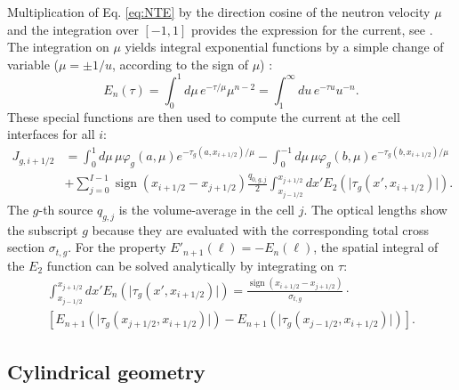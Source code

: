 \documentclass{ictt26}
\DeclareMathOperator{\sign}{sign}
\begin{document}
Multiplication of Eq. \ref{eq:NTE} by the direction cosine of the neutron velocity $\mu$ and the integration over $[-1, 1]$ provides the expression for the current, see \cite{tomatis2011application}. The integration on $\mu$ yields integral exponential functions by a simple change of variable ($\mu = \pm 1/u$, according to the sign of $\mu$) \cite{AS1964handbook}:
\begin{equation*}
E_n(\tau) = \int_0^1{d\mu\, e^{-\tau / \mu} \mu^{n-2}} = \int_1^\infty{du\, e^{-\tau u}u^{-n}}.
\end{equation*}
These special functions are then used to compute the current at the cell interfaces for all $i$:
\begin{equation}
\begin{split}
J_{g,i+1/2} &= \int_0^1 {d\mu\, \mu \varphi_g(a, \mu) e^{-\tau_g(a, x_{i+1/2})/\mu}}
       - \int_0^{-1}{d\mu\, \mu \varphi_g(b, \mu) e^{-\tau_g(b, x_{i+1/2})/\mu}}\\
       & + \sum_{j=0}^{I-1} { \sign(x_{i+1/2} - x_{j+1/2}) \frac{q_{0,g,j}}{2} \int_{x_{j-1/2}}^{x_{j+1/2}}{dx' E_{2}\left(\lvert \tau_g(x', x_{i+1/2}) \rvert \right) } }.
\end{split}
\label{eq:J_tr}
\end{equation}
The $g$-th source $q_{g,j}$ is the volume-average in the cell $j$. The optical lengths show the subscript $g$ because they are evaluated with the corresponding total cross section $\sigma_{t,g}$. For the property $E'_{n+1}(\ell) = -E_n(\ell)$, the spatial integral of the $E_2$ function can be solved analytically by integrating on $\tau$:
\begin{equation*}
\begin{aligned}
\int_{x_{j-1/2}}^{x_{j+1/2}}{ dx' E_{n}\left(\lvert \tau_g(x', x_{i+1/2}) \rvert \right) } =
\frac{\sign(x_{i+1/2} - x_{j+1/2})}{\sigma_{t,g}} \cdot \\
\left[
  E_{n+1} \left(\lvert \tau_g(x_{j+1/2}, x_{i+1/2}) \rvert \right)
 -E_{n+1} \left(\lvert \tau_g(x_{j-1/2}, x_{i+1/2}) \rvert \right)
\right].
\end{aligned}
\end{equation*}

\subsection{Cylindrical geometry}
\label{sec:cylinder}
\end{document}

